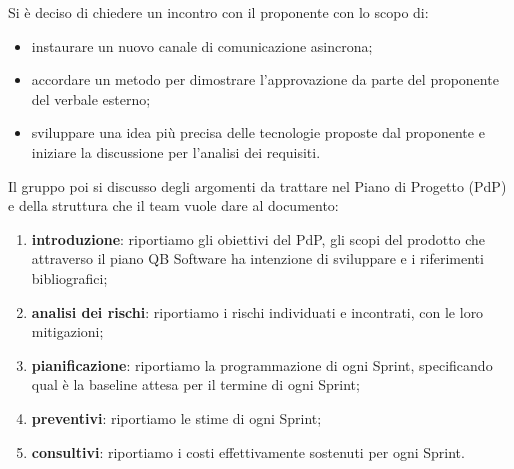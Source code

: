 \documentclass[12pt]{article}
\begin{document}
		\noindent
		Si è deciso di chiedere un incontro con il proponente con lo scopo di:
		\begin{itemize}
			\item instaurare un nuovo canale di comunicazione asincrona;
			\item accordare un metodo per dimostrare l'approvazione da parte del proponente del verbale esterno;
			\item sviluppare una idea più precisa delle tecnologie proposte dal proponente e iniziare la discussione per l'analisi dei requisiti.
		\end{itemize}
		\noindent
		Il gruppo poi si discusso degli argomenti da trattare nel Piano di Progetto (PdP) e della struttura che il team vuole dare al documento:
		\begin{enumerate}
			\item \textbf{introduzione}: riportiamo gli obiettivi del PdP, gli scopi del prodotto che attraverso il piano QB Software ha intenzione di sviluppare e i riferimenti bibliografici;
			\item \textbf{analisi dei rischi}: riportiamo i rischi individuati e incontrati, con le loro mitigazioni;
			\item \textbf{pianificazione}: riportiamo la programmazione di ogni Sprint, specificando qual è la baseline attesa per il termine di ogni Sprint;
			\item \textbf{preventivi}: riportiamo le stime di ogni Sprint;
			\item \textbf{consultivi}: riportiamo i costi effettivamente sostenuti per ogni Sprint.
		\end{enumerate}
		
\end{document}
